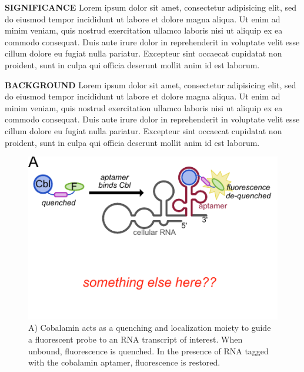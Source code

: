 
{\Large \bf SIGNIFICANCE}
Lorem ipsum dolor sit amet, consectetur adipisicing elit, sed do eiusmod tempor incididunt ut labore et dolore magna aliqua. Ut enim ad minim veniam, quis nostrud exercitation ullamco laboris nisi ut aliquip ex ea commodo consequat. Duis aute irure dolor in reprehenderit in voluptate velit esse cillum dolore eu fugiat nulla pariatur. Excepteur sint occaecat cupidatat non proident, sunt in culpa qui officia deserunt mollit anim id est laborum.\cite{RosendahlSynthesisbiologicalactivity1982}

{\Large \bf BACKGROUND}
Lorem ipsum dolor sit amet, consectetur adipisicing elit, sed do eiusmod tempor incididunt ut labore et dolore magna aliqua. Ut enim ad minim veniam, quis nostrud exercitation ullamco laboris nisi ut aliquip ex ea commodo consequat. Duis aute irure dolor in reprehenderit in voluptate velit esse cillum dolore eu fugiat nulla pariatur. Excepteur sint occaecat cupidatat non proident, sunt in culpa qui officia deserunt mollit anim id est laborum.

\begin{figure}
\begin{centering}
\includegraphics[width=\textwidth]{figures/fig1.pdf}

\end{centering}
\footnotesize
\caption{\label{figure:riboglow}
A) Cobalamin acts as a quenching and localization moiety to guide a fluorescent probe to an RNA transcript of interest. When unbound, fluorescence is quenched. In the presence of RNA tagged with the cobalamin aptamer, fluorescence is restored.
}
\end{figure}

